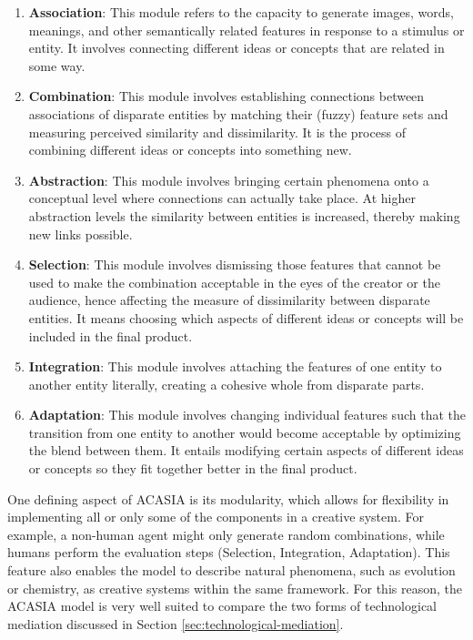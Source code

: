 \begin{enumerate}
\item \textbf{Association}: This module refers to the capacity to generate images, words, meanings, and other semantically related features in response to a stimulus or entity. It involves connecting different ideas or concepts that are related in some way.
\item \textbf{Combination}: This module involves establishing connections between associations of disparate entities by matching their (fuzzy) feature sets and measuring perceived similarity and dissimilarity. It is the process of combining different ideas or concepts into something new.
\item \textbf{Abstraction}: This module involves bringing certain phenomena onto a conceptual level where connections can actually take place. At higher abstraction levels the similarity between entities is increased, thereby making new links possible.
\item \textbf{Selection}: This module involves dismissing those features that cannot be used to make the combination acceptable in the eyes of the creator or the audience, hence affecting the measure of dissimilarity between disparate entities. It means choosing which aspects of different ideas or concepts will be included in the final product.
\item \textbf{Integration}: This module involves attaching the features of one entity to another entity literally, creating a cohesive whole from disparate parts.
\item \textbf{Adaptation}: This module involves changing individual features such that the transition from one entity to another would become acceptable by optimizing the blend between them. It entails modifying certain aspects of different ideas or concepts so they fit together better in the final product.
\end{enumerate}

One defining aspect of ACASIA is its modularity, which allows for flexibility in implementing all or only some of the components in a creative system. For example, a non-human agent might only generate random combinations, while humans perform the evaluation steps (Selection, Integration, Adaptation). This feature also enables the model to describe natural phenomena, such as evolution or chemistry, as creative systems within the same framework. For this reason, the ACASIA model is very well suited to compare the two forms of technological mediation discussed in Section \ref{sec:technological-mediation}.

